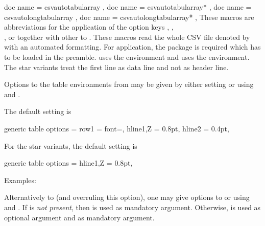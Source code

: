 \documentclass[a4paper,11pt]{ltxdoc}
\begin{document}
\begin{docCommands}[
    doc parameter = \oarg{options}\marg{file name}\oarg{taboptions 1}\oarg{taboptions 2},
    doc new = 2023-10-13
  ]
  {
    { doc name = csvautotabularray  },
    { doc name = csvautotabularray* },
    { doc name = csvautolongtabularray  },
    { doc name = csvautolongtabularray* },
  }
  These macros are abbreviations for the application of the option keys
  , ,\\
  , or 
  together with other  to .
  These macros read the whole CSV file denoted by 
  with an automated formatting.
  For application, the package  is required which has to be
  loaded in the preamble.
   uses the  environment and
   uses the  environment.
  The star variants treat the first line as data line and not as header line.\par
  Options to the table environments from  may be given
  by either setting  or
  using  and .\par
  The default setting is
\begin{dispListing}
generic table options =
  { {
    row{1}     = {font=\bfseries},
    hline{1,Z} = {0.8pt},
    hline{2}   = {0.4pt},
  } }
\end{dispListing}
  For the star variants, the default setting is
\begin{dispListing}
generic table options =
  { {
    hline{1,Z} = {0.8pt},
  } }
\end{dispListing}

Examples:

\begin{dispExample}
\end{dispExample}

\begin{dispExample}
\end{dispExample}

\clearpage

Alternatively to 
(and overruling this option), one may give options to
 or 
using  and .
If  is \emph{not present}, then 
is used as mandatory argument.
Otherwise,  is used as optional argument and
 as mandatory argument.


\end{docCommands}
\end{document}
